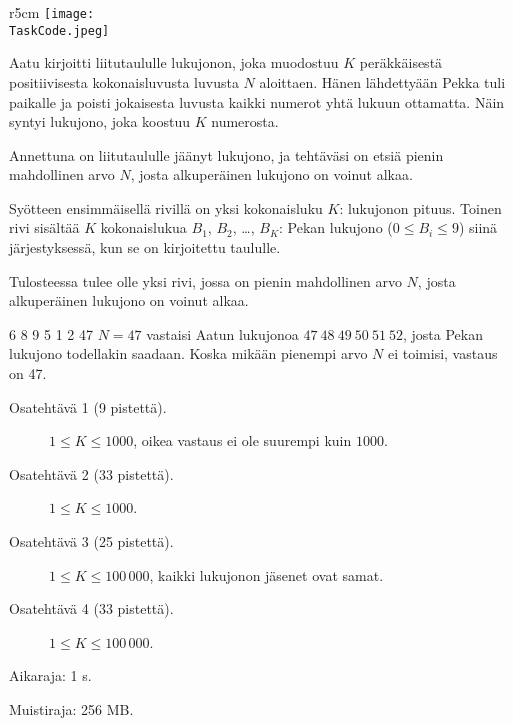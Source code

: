 \documentclass{boi2014-fi}
\renewcommand{\TaskCode}{sequence}
\begin{document}
    \begin{wrapfigure}[5]{r}{5cm}
        \vspace{-24pt}
\texttt{[image: \\TaskCode.jpeg]}
\end{wrapfigure}

    Aatu kirjoitti liitutaululle lukujonon, joka muodostuu $K$ peräkkäisestä
    positiivisesta kokonaisluvusta luvusta $N$ aloittaen.
    Hänen lähdettyään Pekka tuli paikalle ja poisti jokaisesta luvusta
    kaikki numerot yhtä lukuun ottamatta.
    Näin syntyi lukujono, joka koostuu $K$ numerosta.

    \Task

    Annettuna on liitutaululle jäänyt lukujono,
    ja tehtäväsi on etsiä pienin mahdollinen arvo $N$,
    josta alkuperäinen lukujono on voinut alkaa.

    \Input

    Syötteen ensimmäisellä rivillä on yksi kokonaisluku $K$:
    lukujonon pituus. Toinen rivi sisältää $K$ kokonaislukua $B_1$, $B_2$, \dots,
    $B_K$: Pekan lukujono ($0 \le B_i \le 9$) siinä järjestyksessä,
    kun se on kirjoitettu taululle.

    \Output

    Tulosteessa tulee olle yksi rivi, jossa on pienin mahdollinen arvo $N$,
    josta alkuperäinen lukujono on voinut alkaa.

    \Example

    \example
    {
        6 8 9 5 1 2
    }
    {
        47
    }
    {
        $N = 47$ vastaisi Aatun lukujonoa
        $47\ 48\ 49\ 50\ 51\ 52$, josta Pekan lukujono todellakin saadaan.
        Koska mikään pienempi arvo $N$ ei toimisi, vastaus on 47.
    }

\Scoring

\begin{description}
    \item[Osatehtävä 1 (9 pistettä).] $1 \le K \le 1000$, oikea
        vastaus ei ole suurempi kuin $1000$.
    \item[Osatehtävä 2 (33 pistettä).] $1 \le K \le 1000$.
    \item[Osatehtävä 3 (25 pistettä).] $1 \le K \le 100\,000$, kaikki lukujonon jäsenet ovat samat.
    \item[Osatehtävä 4 (33 pistettä).] $1 \le K \le 100\,000$.
\end{description}

\Constraints

Aikaraja: 1 s.

Muistiraja: 256 MB.
\end{document}
